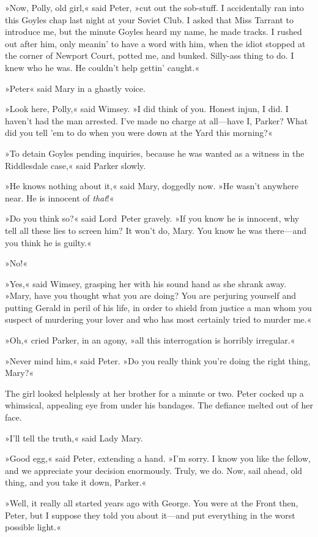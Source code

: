 »Now, Polly, old girl,« said Peter, »cut out the sob-stuff. I accidentally ran into this Goyles chap last night at your Soviet Club.  I asked that Miss Tarrant to introduce me, but the minute Goyles heard my name, he made tracks. I rushed out after him, only meanin' to have a word with him, when the idiot stopped at the corner of Newport Court, potted me, and bunked. Silly-ass thing to do. I knew who he was. He couldn't help gettin' caught.«

»Peter\longdash« said Mary in a ghastly voice.

»Look here, Polly,« said Wimsey. »I did think of you. Honest injun, I did. I haven't had the man arrested. I've made no charge at all—have I, Parker? What did you tell 'em to do when you were down at the Yard this morning?«

»To detain Goyles pending inquiries, because he was wanted as a witness in the Riddlesdale case,« said Parker slowly.

»He knows nothing about it,« said Mary, doggedly now. »He wasn't anywhere near. He is innocent of \textit{that}!«

»Do you think so?« said Lord~Peter gravely. »If you know he is innocent, why tell all these lies to screen him? It won't do, Mary. You know he was there—and you think he is guilty.«

»No!«

»Yes,« said Wimsey, grasping her with his sound hand as she shrank away. »Mary, have you thought what you are doing? You are perjuring yourself and putting Gerald in peril of his life, in order to shield from justice a man whom you suspect of murdering your lover and who has most certainly tried to murder me.«

»Oh,« cried Parker, in an agony, »all this interrogation is horribly irregular.«

»Never mind him,« said Peter. »Do you really think you're doing the right thing, Mary?«

The girl looked helplessly at her brother for a minute or two. Peter cocked up a whimsical, appealing eye from under his bandages. The defiance melted out of her face.

»I'll tell the truth,« said Lady Mary.

»Good egg,« said Peter, extending a hand. »I'm sorry. I know you like the fellow, and we appreciate your decision enormously. Truly, we do.  Now, sail ahead, old thing, and you take it down, Parker.«

»Well, it really all started years ago with George. You were at the Front then, Peter, but I suppose they told you about it—and put everything in the worst possible light.«


